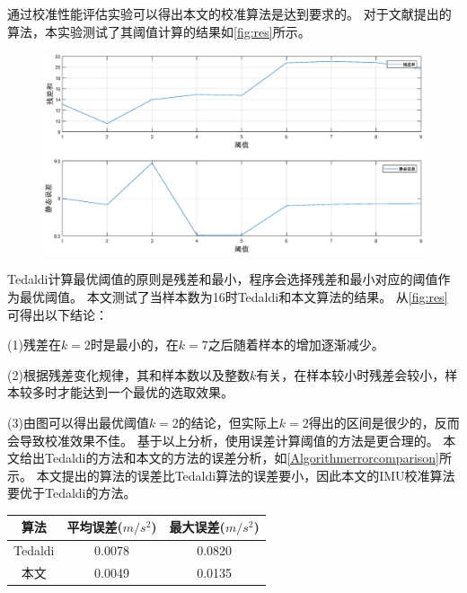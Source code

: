 \documentclass[
  type=master
]{gdutthesis}
\begin{document}
通过校准性能评估实验可以得出本文的校准算法是达到要求的。
对于文献\parencite{tedaldi2014robust}提出的算法，本实验测试了其阈值计算的结果如\autoref{fig:res}所示。
\begin{figure}[H]
	\centering
	\includegraphics[width=1.0\textwidth]{res2.eps}
	\label{fig:res}
\end{figure}

Tedaldi计算最优阈值的原则是残差和最小，程序会选择残差和最小对应的阈值作为最优阈值。
本文测试了当样本数为16时Tedaldi和本文算法的结果。
从\autoref{fig:res}可得出以下结论：

(1)残差在$k=2$时是最小的，在$k=7$之后随着样本的增加逐渐减少。

(2)根据残差变化规律，其和样本数以及整数$k$有关，在样本较小时残差会较小，样本较多时才能达到一个最优的选取效果。

(3)由图可以得出最优阈值$k=2$的结论，但实际上$k=2$得出的区间是很少的，反而会导致校准效果不佳。
基于以上分析，使用误差计算阈值的方法是更合理的。
本文给出Tedaldi的方法和本文的方法的误差分析，如\autoref{Algorithmerrorcomparison}所示。
本文提出的算法的误差比Tedaldi算法的误差要小，因此本文的IMU校准算法要优于Tedaldi的方法。
\begin{table}[H]
	\label{Algorithmerrorcomparison}
	\begin{tabular}{ccc}
		\toprule
		算法 & 平均误差($m/s^2$) & 最大误差($m/s^2$) \\
		\midrule
		Tedaldi & 0.0078 & 0.0820 \\
		本文 & 0.0049 & 0.0135 \\
		\bottomrule
	\end{tabular}
\end{table}
\end{document}
